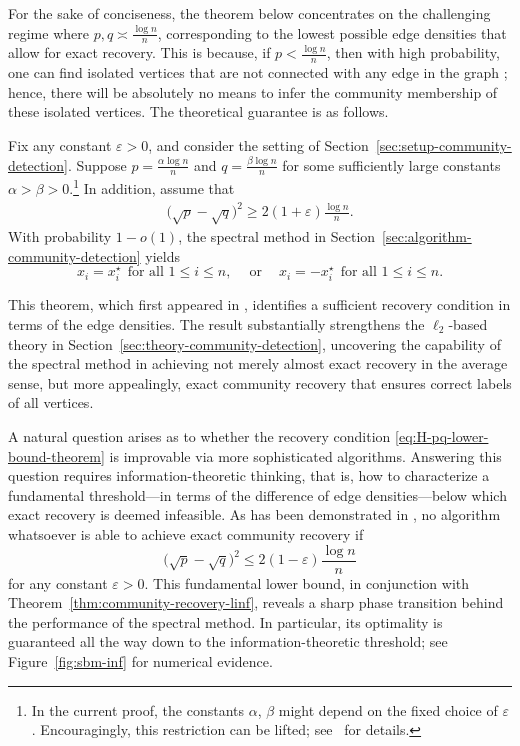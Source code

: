 For the sake of conciseness, the theorem below concentrates on the challenging regime where $p,q\asymp \frac{\log n}{n}$,  corresponding to the lowest possible edge densities that allow for exact recovery. This is because, if $p < \frac{\log n}{n}$, then with high probability, one can find isolated vertices that are not connected with any edge in the graph \citep{durrett2007random}; hence, there will be absolutely no means to infer the community membership of these isolated vertices.  The theoretical guarantee is as follows. 
%
\begin{theorem}
	\label{thm:community-recovery-linf}
	Fix any constant $\varepsilon>0$, and consider the setting of Section~\ref{sec:setup-community-detection}. Suppose  $p=\frac{\alpha \log n}{n}$ and $q=\frac{\beta \log n}{n}$ for some sufficiently large constants $\alpha > \beta >0$.\footnote{In the current proof, the constants $\alpha$, $\beta$ might depend on the fixed choice of $\varepsilon$. Encouragingly, this restriction can be lifted; see~\citet{abbe2020entrywise} for details.} In addition, assume that
	\begin{align}
		\big( \sqrt{p} -\sqrt{q}\big)^2 \geq   2\left( 1+ \varepsilon  \right) \frac{\log n}{n} .
		\label{eq:H-pq-lower-bound-theorem}
	\end{align}
	With probability  $1-o(1)$, the spectral method in Section~\ref{sec:algorithm-community-detection} yields
	\[
		x_{i}=x_{i}^{\star}~~\text{for all }1\leq i\leq n, \quad~\text{or}\quad~ x_{i}=-x_{i}^{\star}~~\text{for all }1\leq i\leq n.
	\]
\end{theorem}
%
This theorem, which first appeared in \citet{abbe2020entrywise},  identifies a sufficient recovery condition in terms of the edge densities. 
The result substantially strengthens the $\ell_2$-based theory in Section~\ref{sec:theory-community-detection}, 
uncovering the capability of the spectral method in achieving not merely almost exact recovery in the average sense, 
but more appealingly,  exact community recovery that ensures correct labels of all vertices.  

A natural question arises as to whether the recovery condition \eqref{eq:H-pq-lower-bound-theorem} is improvable via more sophisticated algorithms. Answering this question requires information-theoretic thinking, that is, how to characterize a fundamental threshold---in terms of the difference of edge densities---below which exact recovery is deemed  infeasible. As has been demonstrated in \citet{abbe2014exact,mossel2015consistency,hajek2015achieving}, no algorithm whatsoever is able to achieve exact community recovery  if
%
\begin{equation}
	\big( \sqrt{p} -\sqrt{q}\big)^2 \leq  2(1-\varepsilon) \frac{\log n}{n} 
	\label{eq:IT-lower-bound-CD}
\end{equation}
%
for any constant $\varepsilon >0$. 
This fundamental lower bound, in conjunction with Theorem~\ref{thm:community-recovery-linf}, reveals a sharp phase transition behind the performance of the spectral method. In particular, its optimality is guaranteed all the way down to the information-theoretic threshold; see Figure~\ref{fig:sbm-inf} for numerical evidence.  

